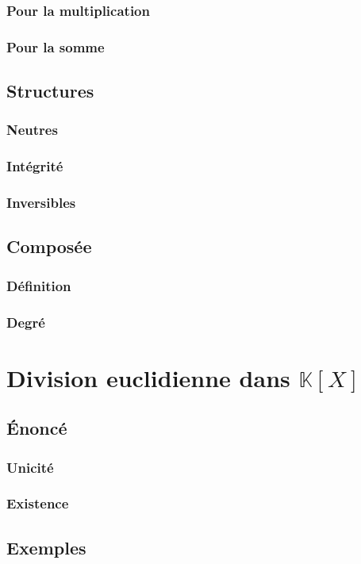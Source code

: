 \documentclass[12pt,a4paper,french]{book}
\begin{document}
			\subsubsection{Pour la multiplication}
			\subsubsection{Pour la somme}
		\subsection{Structures}
			\subsubsection{Neutres}
			\subsubsection{Intégrité}
			\subsubsection{Inversibles}
		\subsection{Composée}
			\subsubsection{Définition}
			\subsubsection{Degré}
	\section{Division euclidienne dans $\mathbb{K}[X]$}
		\subsection{Énoncé}
			\subsubsection{Unicité}
			\subsubsection{Existence}
		\subsection{Exemples}
\end{document}
